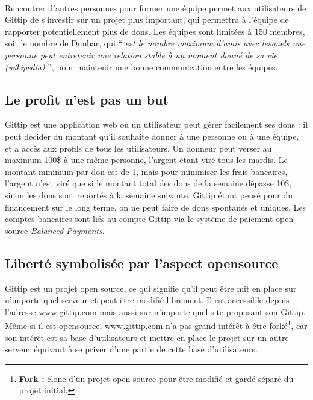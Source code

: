 \paragraph{}
Rencontrer d'autres personnes pour former une équipe permet aux utilisateurs de
Gittip de s'investir sur un projet plus important, qui permettra à l'équipe de
rapporter potentiellement plus de dons. Les équipes sont limitées à 150
membres, soit le nombre de Dunbar, qui `` \emph{est le nombre maximum
d'amis avec lesquels une personne peut entretenir une relation stable à un
moment donné de sa vie. (wikipedia)} '', pour maintenir une bonne communication
entre les équipes.

    \subsection{Le profit n'est pas un but}

Gittip est une application web où un utilisateur peut gérer
facilement ses dons : il peut décider du montant qu'il souhaite donner à une
personne ou à une équipe, et a accès aux profils de tous les utilisateurs. Un
donneur peut verser au maximum 100\${} à une même personne, l'argent étant viré
tous les mardis. Le montant minimum par don est de 1\textcent, mais pour
minimiser les frais bancaires, l'argent n'est viré que si le montant total des
dons de la semaine dépasse 10\${}, sinon les dons sont reportés à la semaine
suivante.  Gittip étant pensé pour du financement sur le long terme, on ne peut
faire de dons spontanés et uniques. Les comptes bancaires sont liés au compte
Gittip via le système de paiement open source \emph{Balanced Payments}.

    \subsection{Liberté symbolisée par l'aspect opensource}

Gittip est un projet open source, ce qui signifie qu'il peut être
mit en place sur n'importe quel serveur et peut être modifié librement.
Il est accessible depuis l'adresse \url{www.gittip.com} mais aussi sur
n'importe quel site proposant son Gittip. Même si il est opensource,
\url{www.gittip.com} n'a pas grand intérêt à être forké\footnote{\textbf{Fork
:} clone d'un projet open source pour être modifié et gardé séparé du
projet initial.}, car son intérêt est sa base d'utilisateurs et mettre en place
le projet sur un autre serveur équivaut à se priver d'une partie de cette base
d'utilisateurs.

